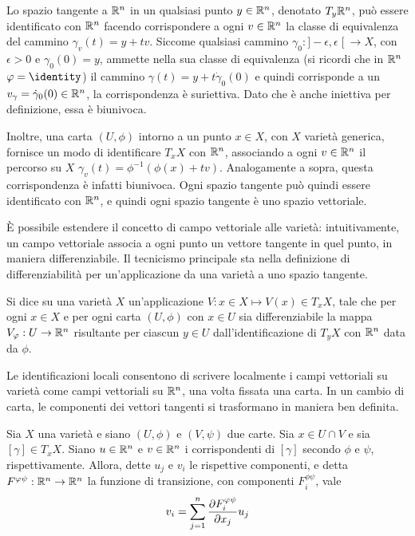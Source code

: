 Lo spazio tangente a $\mathbb{R}^{n}$ in un qualsiasi punto $y \in \mathbb{R}^{n}$, denotato $T_y \mathbb{R}^{n}$, può essere identificato con $\mathbb{R}^{n}$ facendo corrispondere a ogni $v \in \mathbb{R}^{n}$ la classe di equivalenza del cammino $\gamma_v(t) = y + tv$. Siccome qualsiasi cammino $\gamma_0:]-\epsilon,\epsilon\;[\ \to X$, con $\epsilon > 0$ e $\gamma_0(0)=y$, ammette nella sua classe di equivalenza (si ricordi che in $\mathbb{R}^{n}$ $\phi = \identity$) il cammino $\gamma(t) = y + t\dot{\gamma}_0(0)$ e quindi corrisponde a un $v_{\gamma} = \dot{\gamma}_0(0) \in \mathbb{R}^{n}$, la corrispondenza è suriettiva. Dato che è anche iniettiva per definizione, essa è biunivoca. 

Inoltre, una carta $(U, \phi)$ intorno a un punto $x \in  X$, con $X$ varietà generica, fornisce un modo di identificare $T_x X$ con $\mathbb{R}^{n}$, associando a ogni $v \in \mathbb{R}^{n}$ il percorso su $X$ $\gamma_{v}(t) = \phi^{-1}(\phi(x)+tv)$. Analogamente a sopra, questa corrispondenza è infatti biunivoca. Ogni spazio tangente può quindi essere identificato con $\mathbb{R}^{n}$, e quindi ogni spazio tangente è uno spazio vettoriale.

È possibile estendere il concetto di campo vettoriale alle varietà: intuitivamente, un campo vettoriale associa a ogni punto un vettore tangente in quel punto, in maniera differenziabile. Il tecnicismo principale sta nella definizione di differenziabilità per un'applicazione da una varietà a uno spazio tangente.
\begin{definition} \label{def:vecField}
  Si dice  su una varietà $X$ un'applicazione $V: x \in  X \mapsto V (x) \in T_x X$, tale che per ogni $x \in X$ e per ogni carta $(U, \phi)$ con $x \in U$ sia differenziabile la mappa $V_\varphi:U \to \mathbb{R}^{n}$ risultante per ciascun $y \in  U$ dall'identificazione di $T_y X$ con $\mathbb{R}^{n}$ data da $\phi$.
\end{definition}

Le identificazioni locali consentono di scrivere localmente i campi vettoriali su varietà come campi vettoriali su $\mathbb{R}^{n}$, una volta fissata una carta. In un cambio di carta, le componenti dei vettori tangenti si trasformano in maniera ben definita.
\begin{theorem} 
  Sia $X$ una varietà e siano $(U,\phi)$ e $(V,\psi)$ due carte. Sia $x \in  U \cap V$ e sia $[\gamma] \in  T_x X$. Siano $u \in \mathbb{R}^{n}$ e $v \in  \mathbb{R}^{n}$ i corrispondenti di $[\gamma]$ secondo $\phi$ e $\psi$, rispettivamente. Allora, dette $u_j$ e $v_i$ le rispettive componenti, e detta $F^{\varphi\psi}:\mathbb{R}^{n} \to \mathbb{R}^{n}$ la funzione di transizione, con componenti $F^{\phi \psi}_i$, vale \begin{equation} \label{eq:vecTrans}
  v_i = \sum_{j=1}^n \pdv{F^{\varphi\psi}_i}{x_j} u_j
  \end{equation} 
\end{theorem}

